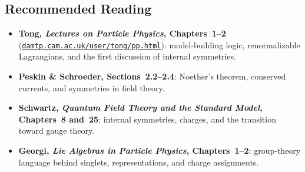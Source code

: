 \documentclass[../main.tex]{subfiles}
\begin{document}
\subsection*{Recommended Reading}

\begin{itemize}
  \item \textbf{Tong, \textit{Lectures on Particle Physics}, Chapters~1--2}
    (\href{https://www.damtp.cam.ac.uk/user/tong/pp.html}{\texttt{damtp.cam.ac.uk/user/tong/pp.html}}):
    model-building logic, renormalizable Lagrangians, and the first discussion of internal symmetries.
  \item \textbf{Peskin \& Schroeder, Sections~2.2--2.4}: Noether's theorem, conserved currents, and symmetries in field theory.
  \item \textbf{Schwartz, \textit{Quantum Field Theory and the Standard Model}, Chapters~8 and~25}: internal symmetries, charges, and the transition toward gauge theory.
  \item \textbf{Georgi, \textit{Lie Algebras in Particle Physics}, Chapters~1--2}: group-theory language behind singlets, representations, and charge assignments.
\end{itemize}
\end{document}
